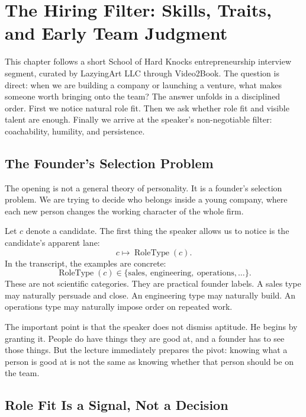 \chapter{The Hiring Filter: Skills, Traits, and Early Team Judgment}

This chapter follows a short School of Hard Knocks entrepreneurship interview segment, curated by LazyingArt LLC through Video2Book. The question is direct: when we are building a company or launching a venture, what makes someone worth bringing onto the team? The answer unfolds in a disciplined order. First we notice natural role fit. Then we ask whether role fit and visible talent are enough. Finally we arrive at the speaker's non-negotiable filter: coachability, humility, and persistence.

\section{The Founder’s Selection Problem}

The opening is not a general theory of personality. It is a founder's selection problem. We are trying to decide who belongs inside a young company, where each new person changes the working character of the whole firm.

Let \(c\) denote a candidate. The first thing the speaker allows us to notice is the candidate's apparent lane:
\begin{equation}
  c \longmapsto \operatorname{RoleType}(c).
\end{equation}
In the transcript, the examples are concrete:
\begin{equation}
  \operatorname{RoleType}(c)
  \in
  \{\text{sales},\ \text{engineering},\ \text{operations},\ldots\}.
\end{equation}
These are not scientific categories. They are practical founder labels. A sales type may naturally persuade and close. An engineering type may naturally build. An operations type may naturally impose order on repeated work.

The important point is that the speaker does not dismiss aptitude. He begins by granting it. People do have things they are good at, and a founder has to see those things. But the lecture immediately prepares the pivot: knowing what a person is good at is not the same as knowing whether that person should be on the team.

\section{Role Fit Is a Signal, Not a Decision}


